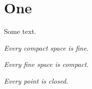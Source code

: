 \section{One}
Some text.

\lemma
{\sl Every compact space is fine.}

\claim
{\sl Every fine space is compact.}

\lemma
{\sl Every point is closed.}

